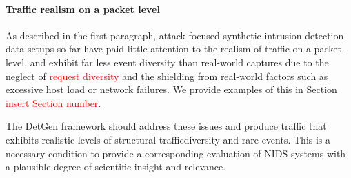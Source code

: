 \documentclass{article}
\begin{document}
\paragraph{Traffic realism on a packet level} As described in the first paragraph, attack-focused synthetic intrusion detection data setups so far have paid little attention to the realism of traffic on a packet-level, and exhibit far less event diversity than real-world captures due to the neglect of \textcolor{red}{request diversity} and the shielding from real-world factors such as excessive host load or network failures. We provide examples of this in Section \textcolor{red}{insert Section number}.

The DetGen framework should address these issues and produce traffic that exhibits realistic levels of structural trafficdiversity and rare events. This is a necessary condition to provide a corresponding evaluation of NIDS systems with a plausible degree of scientific insight and relevance. %



\end{document}
